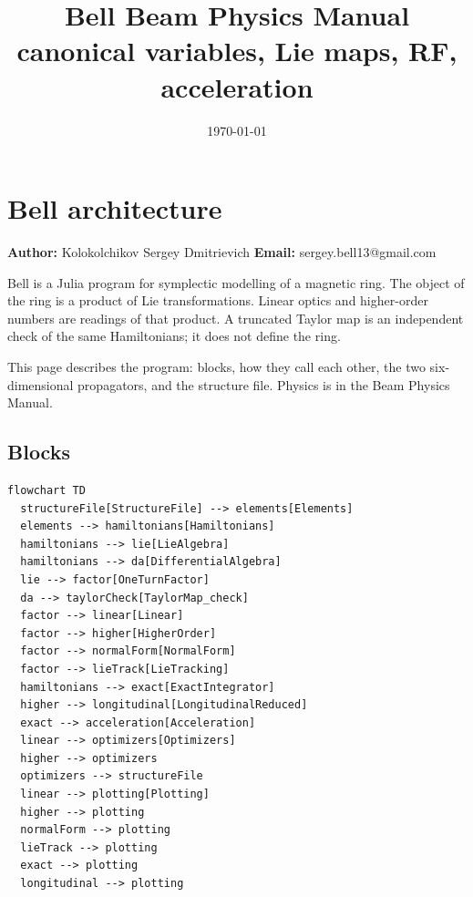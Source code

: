 \documentclass[11pt,a4paper]{article}
\title{Bell Beam Physics Manual\\\large canonical variables, Lie maps, RF, acceleration}
\date{\today}
\begin{document}
\maketitle
\tableofcontents
\clearpage
\section{Bell architecture}

\textbf{Author:} Kolokolchikov Sergey Dmitrievich  
\textbf{Email:} sergey.bell13@gmail.com

Bell is a Julia program for symplectic modelling of a magnetic ring. The
object of the ring is a product of Lie transformations. Linear optics and
higher-order numbers are readings of that product. A truncated Taylor map
is an independent check of the same Hamiltonians; it does not define the
ring.

This page describes the program: blocks, how they call each other, the two
six-dimensional propagators, and the structure file. Physics is in the
Beam Physics Manual.

\subsection{Blocks}

\begin{verbatim}
flowchart TD
  structureFile[StructureFile] --> elements[Elements]
  elements --> hamiltonians[Hamiltonians]
  hamiltonians --> lie[LieAlgebra]
  hamiltonians --> da[DifferentialAlgebra]
  lie --> factor[OneTurnFactor]
  da --> taylorCheck[TaylorMap_check]
  factor --> linear[Linear]
  factor --> higher[HigherOrder]
  factor --> normalForm[NormalForm]
  factor --> lieTrack[LieTracking]
  hamiltonians --> exact[ExactIntegrator]
  higher --> longitudinal[LongitudinalReduced]
  exact --> acceleration[Acceleration]
  linear --> optimizers[Optimizers]
  higher --> optimizers
  optimizers --> structureFile
  linear --> plotting[Plotting]
  higher --> plotting
  normalForm --> plotting
  lieTrack --> plotting
  exact --> plotting
  longitudinal --> plotting
\end{verbatim}
\end{document}
